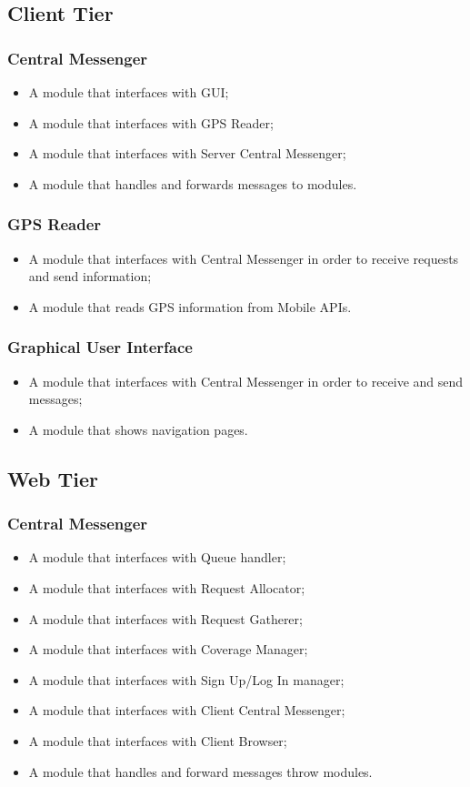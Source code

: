 \subsection{Client Tier}
\subsubsection{Central Messenger}
\begin{itemize}
\item A module that interfaces with GUI;
\item A module that interfaces with GPS Reader;
\item A module that interfaces with Server Central Messenger;
\item A module that handles and forwards messages to modules.
\end{itemize}

\subsubsection{GPS Reader}
\begin{itemize}
\item A module that interfaces with Central Messenger in order to receive requests and send information;
\item A module that reads GPS information from Mobile APIs.
\end{itemize}

\subsubsection{Graphical User Interface}
\begin{itemize}
\item A module that interfaces with Central Messenger in order to receive and send messages;
\item A module that shows navigation pages.
\end{itemize}

\subsection{Web Tier}
\subsubsection{Central Messenger}
\begin{itemize}
\item A module that interfaces with Queue handler;
\item A module that interfaces with Request Allocator;
\item A module that interfaces with Request Gatherer;
\item A module that interfaces with Coverage Manager;
\item A module that interfaces with Sign Up/Log In manager;
\item A module that interfaces with Client Central Messenger;
\item A module that interfaces with Client Browser;
\item A module that handles and forward messages throw modules.
\end{itemize}


